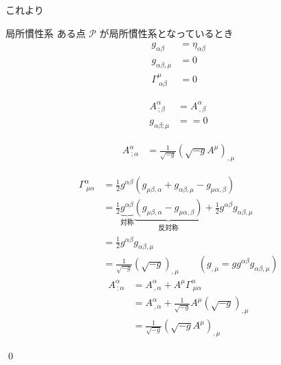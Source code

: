 \documentclass[uplatex,dvipdfmx,a4paper,11pt]{jlreq}
\makeatletter
\theoremstyle{definition}
\renewenvironment{proof}[1][\proofname]{\par
  \normalfont
  \topsep6\p@\@plus6\p@ \trivlist
  \item[\hskip\labelsep{\bfseries #1}\@addpunct{\bfseries}]\ignorespaces\quad\par
}{%
  \qed\endtrivlist\@endpefalse
}
\renewcommand\proofname{証明}
\makeatother
\begin{document}
これより
\begin{itembox}[l]{局所慣性系}
  ある点 $\mathscr{P}$ が局所慣性系となっているとき
  \begin{align}
    g_{\alpha\beta}            & = \eta_{\alpha\beta} \\
    g_{\alpha\beta,\mu}        & = 0                  \\
    \Gamma^\mu_{\ \alpha\beta} & = 0
  \end{align}
\end{itembox}
\begin{align}
  A^\alpha_{\ ;\beta} & = A^\alpha_{\ ,\beta} \\
  g_{\alpha\beta;\mu} & =  = 0
\end{align}

\begin{theorem}[発散の公式]
  \begin{align}
    A^\alpha_{\ ;\alpha} & = \frac{1}{\sqrt{-g}}(\sqrt{-g}A^\mu)_{,\mu}
  \end{align}
\end{theorem}
\begin{proof}
  \begin{align}
    \Gamma^\alpha_{\ \mu\alpha} & = \frac{1}{2}g^{\alpha\beta}(g_{\mu\beta,\alpha} + g_{\alpha\beta,\mu} - g_{\mu\alpha,\beta})                                                                \\
                                & = \frac{1}{2}\underbrace{g^{\alpha\beta}}_{対称}\underbrace{(g_{\mu\beta,\alpha} - g_{\mu\alpha,\beta})}_{反対称} + \frac{1}{2}g^{\alpha\beta}g_{\alpha\beta,\mu} \\
                                & = \frac{1}{2}g^{\alpha\beta}g_{\alpha\beta,\mu}                                                                                                              \\
                                & = \frac{1}{\sqrt{-g}}(\sqrt{-g})_{,\mu} \qquad (g_{,\mu} = gg^{\alpha\beta}g_{\alpha\beta,\mu})
  \end{align}
  \begin{align}
    A^\alpha_{\ ;\alpha} & = A^\alpha_{\ ,\alpha} + A^\mu\Gamma^\alpha_{\ \mu\alpha}           \\
                         & = A^\alpha_{\ ,\alpha} + \frac{1}{\sqrt{-g}}A^\mu(\sqrt{-g})_{,\mu} \\
                         & = \frac{1}{\sqrt{-g}}(\sqrt{-g}A^\mu)_{,\mu}
  \end{align}

\end{proof}
\end{document}
